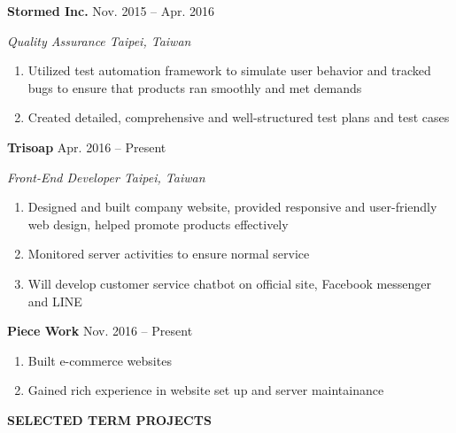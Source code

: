 \documentclass[12pt]{article}
\begin{document}
	\textbf{Stormed Inc.} \hfill Nov. 2015 -- Apr. 2016

	\textit{Quality Assurance \hfill Taipei, Taiwan}

	\begin{enumerate}

		\item Utilized test automation framework to simulate user behavior and tracked bugs to ensure that products ran smoothly and met demands

		\item Created detailed, comprehensive and well-structured test plans and test cases

	\end{enumerate}

	\vspace{0.5em}

	\textbf{Trisoap} \hfill Apr. 2016 -- Present

	\textit{Front-End Developer \hfill Taipei, Taiwan}

	\begin{enumerate}

		\item Designed and built company website, provided responsive and user-friendly web design, helped promote products effectively

		\item Monitored server activities to ensure normal service

		\item Will develop customer service chatbot on official site, Facebook messenger and LINE

	\end{enumerate}

	\vspace{0.5em}

	\textbf{Piece Work} \hfill Nov. 2016 -- Present

	\begin{enumerate}

		\item Built e-commerce websites

		\item Gained rich experience in website set up and server maintainance

	\end{enumerate}

	\vspace{1em}

\textbf{\large{\uppercase{Selected Term Projects}}}
\hrulefill{}
\end{document}
